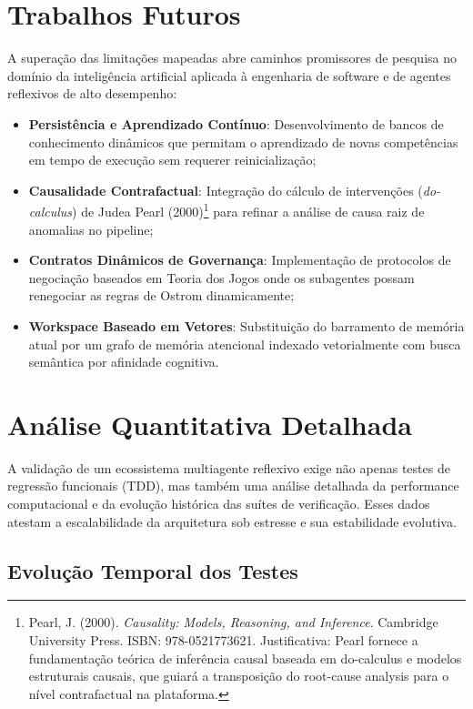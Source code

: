 \documentclass[12pt,a4paper,oneside]{abntex2}
\begin{document}
\section{Trabalhos Futuros}

A superação das limitações mapeadas abre caminhos promissores de pesquisa no domínio da inteligência artificial aplicada à engenharia de software e de agentes reflexivos de alto desempenho:

\begin{itemize}
    \item \textbf{Persistência e Aprendizado Contínuo}: Desenvolvimento de bancos de conhecimento dinâmicos que permitam o aprendizado de novas competências em tempo de execução sem requerer reinicialização;
    \item \textbf{Causalidade Contrafactual}: Integração do cálculo de intervenções (\textit{do-calculus}) de Judea Pearl (2000)\footnote{Pearl, J. (2000). \textit{Causality: Models, Reasoning, and Inference}. Cambridge University Press. ISBN: 978-0521773621. Justificativa: Pearl fornece a fundamentação teórica de inferência causal baseada em do-calculus e modelos estruturais causais, que guiará a transposição do root-cause analysis para o nível contrafactual na plataforma.} para refinar a análise de causa raiz de anomalias no pipeline;
    \item \textbf{Contratos Dinâmicos de Governança}: Implementação de protocolos de negociação baseados em Teoria dos Jogos onde os subagentes possam renegociar as regras de Ostrom dinamicamente;
    \item \textbf{Workspace Baseado em Vetores}: Substituição do barramento de memória atual por um grafo de memória atencional indexado vetorialmente com busca semântica por afinidade cognitiva.
\end{itemize}

\section{Análise Quantitativa Detalhada}

A validação de um ecossistema multiagente reflexivo exige não apenas testes de regressão funcionais (TDD), mas também uma análise detalhada da performance computacional e da evolução histórica das suítes de verificação. Esses dados atestam a escalabilidade da arquitetura sob estresse e sua estabilidade evolutiva.

\subsection{Evolução Temporal dos Testes}
\end{document}
